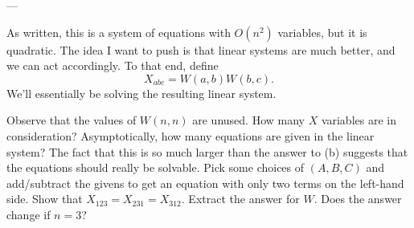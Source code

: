 ---

As written, this is a system of equations with $O(n^2)$ variables,
but it is quadratic.
The idea I want to push is that linear systems are much better,
and we can act accordingly.
To that end, define \[ X_{abc} = W(a,b)W(b,c). \]
We'll essentially be solving the resulting linear system.
\begin{walk}
  \ii Observe that the values of $W(n,n)$ are unused.
  \ii How many $X$ variables are in consideration?
  \ii Asymptotically, how many equations are given in the linear system?
  The fact that this is so much larger than the answer to (b)
  suggests that the equations should really be solvable.
  \ii Pick some choices of $(A,B,C)$ and add/subtract the givens
  to get an equation with only two terms on the left-hand side.
  \ii Show that $X_{123} = X_{231} = X_{312}$.
  \ii Extract the answer for $W$.
  \ii Does the answer change if $n=3$?
\end{walk}
